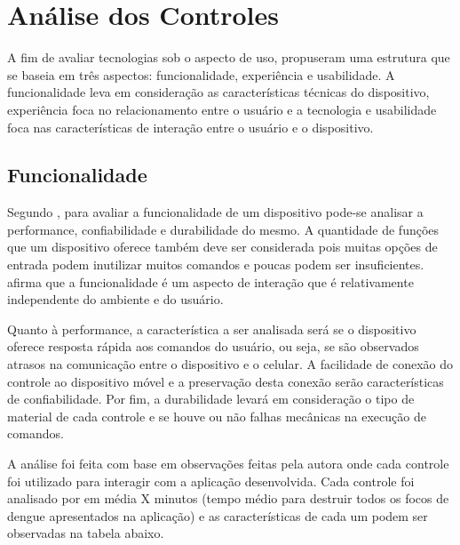 \chapter{Análise dos Controles}
\label{c.analise}

A fim de avaliar tecnologias sob o aspecto de uso,  propuseram uma estrutura que se baseia em três aspectos: funcionalidade, experiência e usabilidade. A funcionalidade leva em consideração as características técnicas do dispositivo, experiência foca no relacionamento entre o usuário e a tecnologia e usabilidade foca nas características de interação entre o usuário e o dispositivo. 


\section{Funcionalidade}
\label{funcionalidade}

Segundo , para avaliar a funcionalidade de um dispositivo pode-se analisar a performance, confiabilidade e durabilidade do mesmo. A quantidade de funções que um dispositivo oferece também deve ser considerada pois muitas opções de entrada podem inutilizar muitos comandos e poucas podem ser insuficientes.  afirma que a funcionalidade é um aspecto de interação que é relativamente independente do ambiente e do usuário. 

Quanto à performance, a característica a ser analisada será se o dispositivo oferece resposta rápida aos comandos do usuário, ou seja, se são observados atrasos na comunicação entre o dispositivo e o celular. A facilidade de conexão do controle ao dispositivo móvel e a preservação desta conexão serão características de confiabilidade. Por fim, a durabilidade levará em consideração o tipo de material de cada controle e se houve ou não falhas mecânicas na execução de comandos.

A análise foi feita com base em observações feitas pela autora onde cada controle foi utilizado para interagir com a aplicação desenvolvida. Cada controle foi analisado por em média X minutos (tempo médio para destruir todos os focos de dengue apresentados na aplicação) e as características de cada um podem ser observadas na tabela abaixo.

